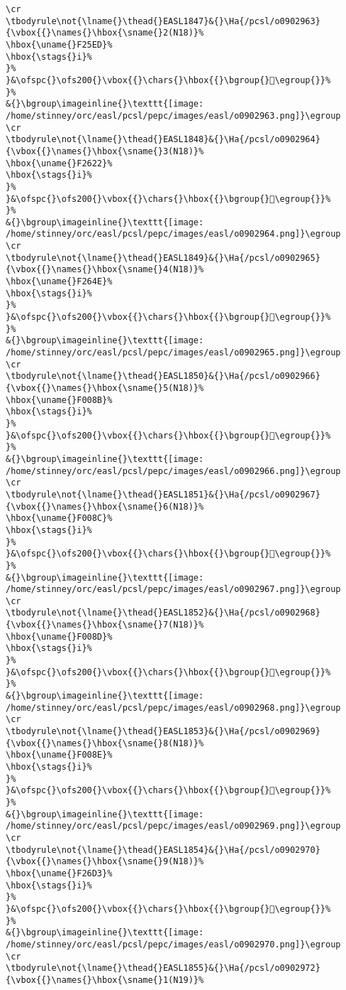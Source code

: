 \begin{verbatim}
\cr
\tbodyrule\not{\lname{}\thead{}EASL1847}&{}\Ha{/pcsl/o0902963}{\vbox{{}\names{}\hbox{\sname{}2(N18)}%
\hbox{\uname{}F25ED}%
\hbox{\stags{}i}%
}%
}&\ofspc{}\ofs200{}\vbox{{}\chars{}\hbox{{}\bgroup{}󲗭\egroup{}}%
}%
&{}\bgroup\imageinline{}\texttt{[image: /home/stinney/orc/easl/pcsl/pepc/images/easl/o0902963.png]}\egroup
\cr
\tbodyrule\not{\lname{}\thead{}EASL1848}&{}\Ha{/pcsl/o0902964}{\vbox{{}\names{}\hbox{\sname{}3(N18)}%
\hbox{\uname{}F2622}%
\hbox{\stags{}i}%
}%
}&\ofspc{}\ofs200{}\vbox{{}\chars{}\hbox{{}\bgroup{}󲘢\egroup{}}%
}%
&{}\bgroup\imageinline{}\texttt{[image: /home/stinney/orc/easl/pcsl/pepc/images/easl/o0902964.png]}\egroup
\cr
\tbodyrule\not{\lname{}\thead{}EASL1849}&{}\Ha{/pcsl/o0902965}{\vbox{{}\names{}\hbox{\sname{}4(N18)}%
\hbox{\uname{}F264E}%
\hbox{\stags{}i}%
}%
}&\ofspc{}\ofs200{}\vbox{{}\chars{}\hbox{{}\bgroup{}󲙎\egroup{}}%
}%
&{}\bgroup\imageinline{}\texttt{[image: /home/stinney/orc/easl/pcsl/pepc/images/easl/o0902965.png]}\egroup
\cr
\tbodyrule\not{\lname{}\thead{}EASL1850}&{}\Ha{/pcsl/o0902966}{\vbox{{}\names{}\hbox{\sname{}5(N18)}%
\hbox{\uname{}F008B}%
\hbox{\stags{}i}%
}%
}&\ofspc{}\ofs200{}\vbox{{}\chars{}\hbox{{}\bgroup{}󰂋\egroup{}}%
}%
&{}\bgroup\imageinline{}\texttt{[image: /home/stinney/orc/easl/pcsl/pepc/images/easl/o0902966.png]}\egroup
\cr
\tbodyrule\not{\lname{}\thead{}EASL1851}&{}\Ha{/pcsl/o0902967}{\vbox{{}\names{}\hbox{\sname{}6(N18)}%
\hbox{\uname{}F008C}%
\hbox{\stags{}i}%
}%
}&\ofspc{}\ofs200{}\vbox{{}\chars{}\hbox{{}\bgroup{}󰂌\egroup{}}%
}%
&{}\bgroup\imageinline{}\texttt{[image: /home/stinney/orc/easl/pcsl/pepc/images/easl/o0902967.png]}\egroup
\cr
\tbodyrule\not{\lname{}\thead{}EASL1852}&{}\Ha{/pcsl/o0902968}{\vbox{{}\names{}\hbox{\sname{}7(N18)}%
\hbox{\uname{}F008D}%
\hbox{\stags{}i}%
}%
}&\ofspc{}\ofs200{}\vbox{{}\chars{}\hbox{{}\bgroup{}󰂍\egroup{}}%
}%
&{}\bgroup\imageinline{}\texttt{[image: /home/stinney/orc/easl/pcsl/pepc/images/easl/o0902968.png]}\egroup
\cr
\tbodyrule\not{\lname{}\thead{}EASL1853}&{}\Ha{/pcsl/o0902969}{\vbox{{}\names{}\hbox{\sname{}8(N18)}%
\hbox{\uname{}F008E}%
\hbox{\stags{}i}%
}%
}&\ofspc{}\ofs200{}\vbox{{}\chars{}\hbox{{}\bgroup{}󰂎\egroup{}}%
}%
&{}\bgroup\imageinline{}\texttt{[image: /home/stinney/orc/easl/pcsl/pepc/images/easl/o0902969.png]}\egroup
\cr
\tbodyrule\not{\lname{}\thead{}EASL1854}&{}\Ha{/pcsl/o0902970}{\vbox{{}\names{}\hbox{\sname{}9(N18)}%
\hbox{\uname{}F26D3}%
\hbox{\stags{}i}%
}%
}&\ofspc{}\ofs200{}\vbox{{}\chars{}\hbox{{}\bgroup{}󲛓\egroup{}}%
}%
&{}\bgroup\imageinline{}\texttt{[image: /home/stinney/orc/easl/pcsl/pepc/images/easl/o0902970.png]}\egroup
\cr
\tbodyrule\not{\lname{}\thead{}EASL1855}&{}\Ha{/pcsl/o0902972}{\vbox{{}\names{}\hbox{\sname{}1(N19)}%

\end{verbatim}
